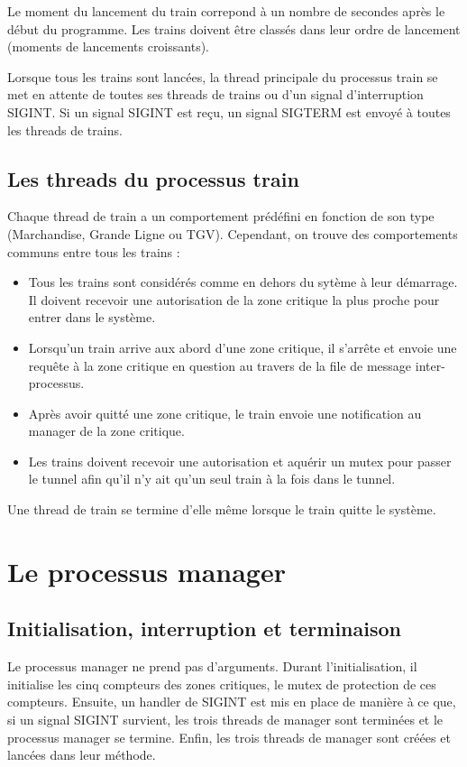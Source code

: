 \documentclass[a4paper,12pt]{article}
\begin{document}
Le moment du lancement du train correpond à un nombre de secondes après le début du programme. Les trains doivent être classés dans leur ordre de lancement (moments de lancements croissants).

Lorsque tous les trains sont lancées, la thread principale du processus train se met en attente de toutes ses threads de trains ou d'un signal d'interruption SIGINT. Si un signal SIGINT est reçu, un signal SIGTERM est envoyé à toutes les threads de trains.

\subsection{Les threads du processus train}

Chaque thread de train a un comportement prédéfini en fonction de son type (Marchandise, Grande Ligne ou TGV). Cependant, on trouve des comportements communs entre tous les trains :
\begin{itemize}
	\item Tous les trains sont considérés comme en dehors du sytème à leur démarrage. Il doivent recevoir une autorisation de la zone critique la plus proche pour entrer dans le système.
	\item Lorsqu'un train arrive aux abord d'une zone critique, il s'arrête et envoie une requête à la zone critique en question au travers de la file de message inter-processus.
	\item Après avoir quitté une zone critique, le train envoie une notification au manager de la zone critique.
	\item Les trains doivent recevoir une autorisation et aquérir un mutex pour passer le tunnel afin qu'il n'y ait qu'un seul train à la fois dans le tunnel.
\end{itemize}
Une thread de train se termine d'elle même lorsque le train quitte le système.

\section{Le processus manager}

\subsection{Initialisation, interruption et terminaison}

Le processus manager ne prend pas d'arguments. Durant l'initialisation, il initialise les cinq compteurs des zones critiques, le mutex de protection de ces compteurs. Ensuite, un handler de SIGINT est mis en place de manière à ce que, si un signal SIGINT survient, les trois threads de manager sont terminées et le processus manager se termine. Enfin, les trois threads de manager sont créées et lancées dans leur méthode.
\end{document}
